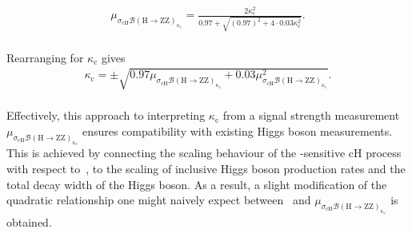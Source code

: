 \begin{align}
    \mu_{\sigma_{\mathrm{cH}}\mathcal{B}\mathrm{(H\rightarrow ZZ)}_{\kappa_c}} = \frac{2\kappa_{\mathrm{c}}^2}{0.97 + \sqrt{(0.97)^2 + 4\cdot0.03\kappa_{\mathrm{c}}^2}}.
\end{align}
\\
Rearranging for $\kappa_{\mathrm{c}}$ gives
\\
\begin{align}
    \kappa_{\mathrm{c}} = \pm \sqrt{0.97\mu_{\sigma_{\mathrm{cH}}\mathcal{B}\mathrm{(H\rightarrow ZZ)}_{\kappa_c}} + 0.03\mu_{\sigma_{\mathrm{cH}}\mathcal{B}\mathrm{(H\rightarrow ZZ)}_{\kappa_c}}^2}.
\end{align}
\\
Effectively, this approach to interpreting $\kappa_{\mathrm{c}}$ from a signal strength measurement $\mu_{\sigma_{\mathrm{cH}}\mathcal{B}\mathrm{(H\rightarrow ZZ)}_{\kappa_c}}$ ensures compatibility with existing Higgs boson measurements. This is achieved by connecting the scaling behaviour of the \kappac-sensitive cH process with respect to \kappac \,, to the scaling of inclusive Higgs boson production rates and the total decay width of the Higgs boson. As a result, a slight modification of the quadratic relationship one might naively expect between \kappac\, and $\mu_{\sigma_{\mathrm{cH}}\mathcal{B}\mathrm{(H\rightarrow ZZ)}_{\kappa_c}}$ is obtained.

